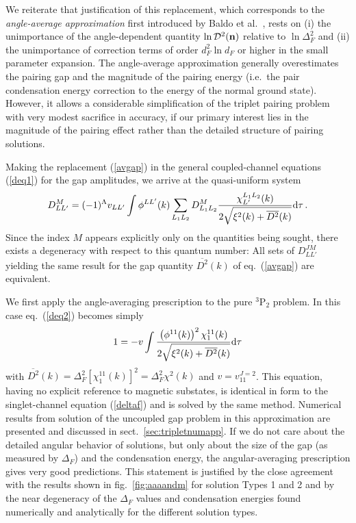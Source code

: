 We reiterate that justification of this replacement, which corresponds
to the {\it angle-average approximation} first introduced by Baldo
et al.~\cite{baldo2}, rests on (i) the unimportance of the angle-dependent
quantity $\ln {\cal D}^2 ({\bf n})$ relative to $\ln \Delta_F^2$ and
(ii) the unimportance of correction terms of order $d_F^2 \ln d_F$
or higher in the small parameter expansion.  The angle-average
approximation generally overestimates the pairing gap and the magnitude
of the pairing energy (i.e.\ the pair condensation energy correction to
the energy of the normal ground state).  However, it allows a considerable
simplification of the triplet pairing problem with very modest
sacrifice in accuracy, if our primary interest lies in the
magnitude of the pairing effect rather than the detailed structure
of pairing solutions.

Making the replacement (\ref{avgap}) in the general coupled-channel
equations (\ref{deq1}) for the gap amplitudes, we arrive at the
quasi-uniform system
\begin{equation}
D_{LL'}^M =  (-1)^\Lambda v_{LL'}\int\phi^{LL'}(k)\sum_{L_1L_2}
D_{L_1L_2}^M \frac{\chi^{L_1L_2}_{L'}(k)}
{2\sqrt{\xi^2(k) + {\overline{D^2}}(k)}}{\rm d}\tau \, .
\label{deq2}
\end{equation}
Since the index $M$ appears explicitly only on the quantities
being sought, there exists a degeneracy with respect to this
quantum number:  All sets of $D_{LL'}^{JM}$ yielding the same
result for the gap quantity ${\overline{D^2}}(k)$ of eq.~(\ref{avgap})
are equivalent.

We first apply the angle-averaging prescription to the pure
$^3$P$_2$ problem.  In this case eq.~(\ref{deq2}) becomes simply
\begin{equation}
1=-v  \int  { \left(\phi^{11}(k)\right)^2\chi^{11}_1(k) \over
   2\sqrt{\xi^2(k) + {\overline{D^2}}(k)}}{\rm d}\tau
\label{sss}
\end{equation}
with ${\overline{D^2}}(k) =\Delta^2_F[\chi^{11}_1(k)]^2 
=\Delta^2_F\chi^2(k)$ and $v=v_{11}^{J=2}$.
This equation, having no explicit reference to magnetic substates,
is identical in form to the singlet-channel equation (\ref{deltaf})
and is solved by the same method.  Numerical results from solution
of the uncoupled gap problem in this approximation are presented
and discussed in sect.~\ref{sec:tripletnumapp}.
If we do not care about the detailed angular behavior of solutions, but 
only about the size of the gap (as measured by $\Delta_F$) and the
condensation energy, the angular-averaging prescription gives very
good predictions.  This statement is justified by the close
agreement with the results shown in fig.~\ref{fig:aaaandm} for
solution Types 1 and 2 and by the near degeneracy of the
$\Delta_F$ values and condensation energies found numerically
\cite{tt71,ttr,ostgaard} and analytically \cite{univ} for the
different solution types.


